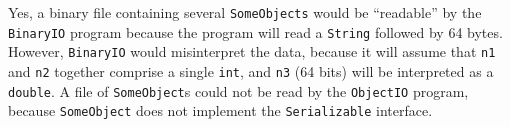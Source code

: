 \begin{ANS}
\item  Yes, a binary file containing several {\tt SomeObjects} would be
``readable'' by the {\tt BinaryIO} program because the program will
read a {\tt String} followed by 64 bytes.  However, {\tt BinaryIO}
would misinterpret the data, because it will assume that {\tt n1} and
{\tt n2} together comprise a single {\tt int}, and {\tt n3} (64 bits)
will be interpreted as a {\tt double}. A file of {\tt SomeObject}s
could not be read by the {\tt ObjectIO} program, because
{\tt SomeObject} does not implement the {\tt Serializable} interface.

\end{ANS}


